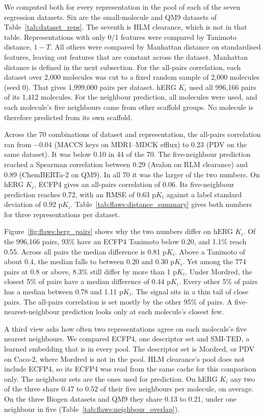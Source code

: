 We computed both for every representation in the pool of each of the seven regression datasets. Six are the small-molecule and QM9 datasets of Table~\ref{tab:dataset_reps}. The seventh is HLM clearance, which is not in that table. Representations with only 0/1 features were compared by Tanimoto distance, $1-T$. All others were compared by Manhattan distance on standardised features, leaving out features that are constant across the dataset. Manhattan distance is defined in the next subsection. For the all-pairs correlation, each dataset over 2,000 molecules was cut to a fixed random sample of 2,000 molecules (seed 0). That gives 1,999,000 pairs per dataset. hERG $K_i$ used all 996,166 pairs of its 1,412 molecules. For the neighbour prediction, all molecules were used, and each molecule's five neighbours came from other scaffold groups. No molecule is therefore predicted from its own scaffold.

Across the 70 combinations of dataset and representation, the all-pairs correlation ran from $-0.04$ (MACCS keys on MDR1--MDCK efflux) to 0.23 (PDV on the same dataset). It was below 0.10 in 44 of the 70. The five-neighbour prediction reached a Spearman correlation between 0.29 (Avalon on RLM clearance) and 0.89 (ChemBERTa-2 on QM9). In all 70 it was the larger of the two numbers. On hERG $K_i$, ECFP4 gives an all-pairs correlation of 0.06. Its five-neighbour prediction reaches 0.72, with an RMSE of 0.63 p$K_i$ against a label standard deviation of 0.92 p$K_i$. Table~\ref{tab:flaws:distance_summary} gives both numbers for three representations per dataset.

Figure~\ref{fig:flaws:herg_pairs} shows why the two numbers differ on hERG $K_i$. Of the 996,166 pairs, 93\% have an ECFP4 Tanimoto below 0.20, and 1.1\% reach 0.55. Across all pairs the median difference is 0.81 p$K_i$. Above a Tanimoto of about 0.4, the median falls to between 0.20 and 0.30 p$K_i$. Yet among the 774 pairs at 0.8 or above, 8.3\% still differ by more than 1 p$K_i$. Under Mordred, the closest 5\% of pairs have a median difference of 0.44 p$K_i$. Every other 5\% of pairs has a median between 0.78 and 1.11 p$K_i$. The signal sits in a thin tail of close pairs. The all-pairs correlation is set mostly by the other 95\% of pairs. A five-nearest-neighbour prediction looks only at each molecule's closest few.

A third view asks how often two representations agree on each molecule's five nearest neighbours. We compared ECFP4, one descriptor set and SMI-TED, a learned embedding that is in every pool. The descriptor set is Mordred, or PDV on Caco-2, where Mordred is not in the pool. HLM clearance's pool does not include ECFP4, so its ECFP4 was read from the same cache for this comparison only. The neighbour sets are the ones used for prediction. On hERG $K_i$ any two of the three share 0.47 to 0.52 of their five neighbours per molecule, on average. On the three Biogen datasets and QM9 they share 0.13 to 0.21, under one neighbour in five (Table~\ref{tab:flaws:neighbour_overlap}).

